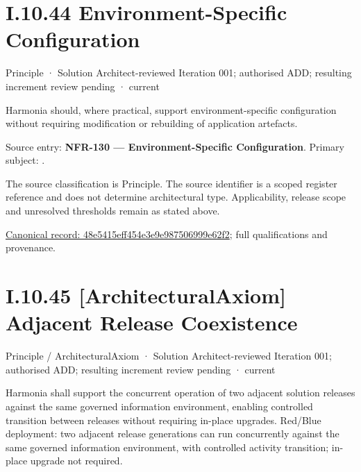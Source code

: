 \section*{I.10.44 Environment-Specific Configuration}
\label{navigation:I.10.44}

\label{element:48e5415eff454e3e9e987506999e62f2}
{\small Principle · Solution Architect-reviewed Iteration 001; authorised ADD; resulting increment review pending · current}\par

Harmonia should, where practical, support environment-specific configuration without requiring modification or rebuilding of application artefacts.



Source entry: \textbf{NFR-130 — Environment-Specific Configuration}. Primary subject: \texttt{}.



The source classification is Principle. The source identifier is a scoped register reference and does not determine architectural type. Applicability, release scope and unresolved thresholds remain as stated above.


{\footnotesize \href{../../../../../../../continuum/motivation/principle/48e5415eff454e3e9e987506999e62f2.md}{Canonical record: 48e5415eff454e3e9e987506999e62f2}; full qualifications and provenance.}\par
\section*{I.10.45 [ArchitecturalAxiom] Adjacent Release Coexistence}
\label{navigation:I.10.45}

\label{element:3ce5568f2ded498386fd6fcfb142f89a}
{\small Principle / ArchitecturalAxiom · Solution Architect-reviewed Iteration 001; authorised ADD; resulting increment review pending · current}\par

Harmonia shall support the concurrent operation of two adjacent solution releases against the same governed information environment, enabling controlled transition between releases without requiring in-place upgrades. Red/Blue deployment: two adjacent release generations can run concurrently against the same governed information environment, with controlled activity transition; in-place upgrade not required.



